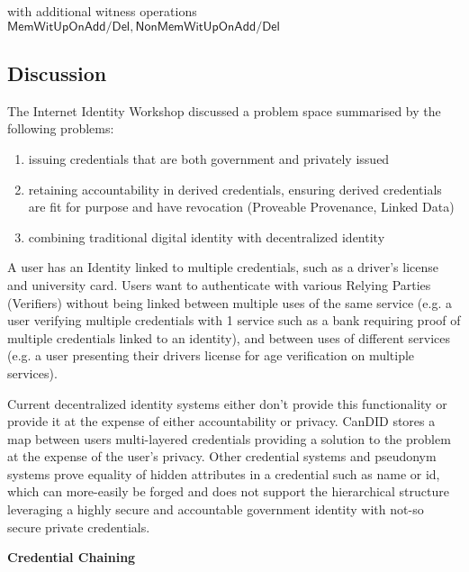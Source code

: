  with additional witness operations $\mathsf{MemWitUpOnAdd/Del, NonMemWitUpOnAdd/Del}$ 


 \subsection{Discussion}
 
The Internet Identity Workshop discussed a problem space summarised by the following problems:
\begin{enumerate}
    \item issuing credentials that are both government and privately issued
    \item retaining accountability in derived credentials, ensuring derived credentials are fit for purpose and have revocation (Proveable Provenance, Linked Data)
    \item combining traditional digital identity with decentralized identity
\end{enumerate}

A user has an Identity linked to multiple credentials, such as a driver's license and university card. Users want to authenticate with various Relying Parties (Verifiers) without being linked between multiple uses of the same service (e.g. a user verifying multiple credentials with 1 service such as a bank requiring proof of multiple credentials linked to an identity), and between uses of different services (e.g. a user presenting their drivers license for age verification on multiple services).

Current decentralized identity systems either don't provide this functionality or provide it at the expense of either accountability or privacy. CanDID stores a map between users multi-layered credentials providing a solution to the problem at the expense of the user's privacy. Other credential systems and pseudonym systems prove equality of hidden attributes in a credential such as name or id, which can more-easily be forged and does not support the hierarchical structure leveraging a highly secure and accountable government identity with not-so secure private credentials.


\noindent \textbf{Credential Chaining}


